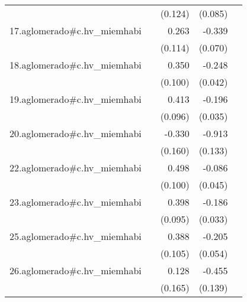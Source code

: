 {\begin{longtable}{l*{4}{D{.}{.}{-1}}}
            &                     &     (0.124)         &     (0.085)         &                     \\
\addlinespace
17.aglomerado#c.hv\_miemhabi&                     &       0.263\sym{*}  &      -0.339\sym{***}&                     \\
            &                     &     (0.114)         &     (0.070)         &                     \\
\addlinespace
18.aglomerado#c.hv\_miemhabi&                     &       0.350\sym{***}&      -0.248\sym{***}&                     \\
            &                     &     (0.100)         &     (0.042)         &                     \\
\addlinespace
19.aglomerado#c.hv\_miemhabi&                     &       0.413\sym{***}&      -0.196\sym{***}&                     \\
            &                     &     (0.096)         &     (0.035)         &                     \\
\addlinespace
20.aglomerado#c.hv\_miemhabi&                     &      -0.330\sym{*}  &      -0.913\sym{***}&                     \\
            &                     &     (0.160)         &     (0.133)         &                     \\
\addlinespace
22.aglomerado#c.hv\_miemhabi&                     &       0.498\sym{***}&      -0.086         &                     \\
            &                     &     (0.100)         &     (0.045)         &                     \\
\addlinespace
23.aglomerado#c.hv\_miemhabi&                     &       0.398\sym{***}&      -0.186\sym{***}&                     \\
            &                     &     (0.095)         &     (0.033)         &                     \\
\addlinespace
25.aglomerado#c.hv\_miemhabi&                     &       0.388\sym{***}&      -0.205\sym{***}&                     \\
            &                     &     (0.105)         &     (0.054)         &                     \\
\addlinespace
26.aglomerado#c.hv\_miemhabi&                     &       0.128         &      -0.455\sym{**} &                     \\
            &                     &     (0.165)         &     (0.139)         &                     \\

\end{longtable}}
